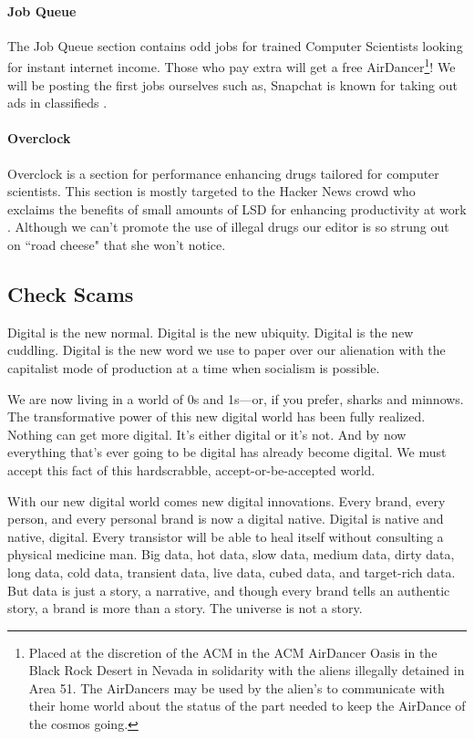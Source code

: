 \paragraph{Job Queue}
The Job Queue section contains odd jobs for trained Computer Scientists looking
for instant internet income.
Those who pay extra will get a free AirDancer\footnote{Placed at the discretion
of the ACM in the ACM AirDancer Oasis in the Black Rock Desert in Nevada in
solidarity with the aliens illegally detained in Area 51. The AirDancers may
be used by the alien's to communicate with their home world about the status of the part needed to keep the AirDance of the cosmos going.}!
We will be posting the first jobs ourselves such as,
Snapchat is known for taking out ads in classifieds .

\paragraph{Overclock}
Overclock is a section for performance enhancing drugs tailored for computer
scientists.
This section is mostly targeted to the Hacker News crowd who exclaims the
benefits of small amounts of LSD for enhancing productivity at work
.
Although we can't promote the use of illegal drugs our editor is so strung out
on ``road cheese" that she won't notice.

\subsection{Check Scams}

Digital is the new normal. Digital is the new ubiquity. Digital is the new cuddling. Digital is the new word we use to paper over our alienation with the capitalist mode of production at a time when socialism is possible.

We are now living in a world of 0s and 1s---or, if you prefer, sharks and minnows. The transformative power of this new digital world has been fully realized. Nothing can get more digital. It's either digital or it's not. And by now everything that's ever going to be digital has already become digital. We must accept this fact of this hardscrabble, accept-or-be-accepted world.

With our new digital world comes new digital innovations. Every brand, every person, and every personal brand is now a digital native. Digital is native and native, digital. Every transistor will be able to heal itself without consulting a physical medicine man. Big data, hot data, slow data, medium data, dirty data, long data, cold data, transient data, live data, cubed data, and target-rich data. But data is just a story, a narrative, and though every brand tells an authentic story, a brand is more than a story. The universe is not a story.

